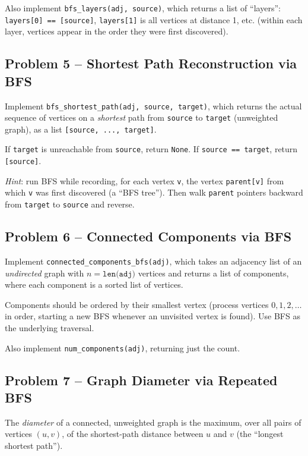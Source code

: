 \documentclass[11pt]{article}
\begin{document}
Also implement \texttt{bfs\_layers(adj, source)}, which returns a list of ``layers'':
\texttt{layers[0] == [source]}, \texttt{layers[1]} is all vertices at distance 1, etc.
(within each layer, vertices appear in the order they were first discovered).

\subsection*{Problem 5 -- Shortest Path Reconstruction via BFS}

Implement \texttt{bfs\_shortest\_path(adj, source, target)}, which returns the actual
sequence of vertices on a \emph{shortest} path from \texttt{source} to \texttt{target}
(unweighted graph), as a list \texttt{[source, ..., target]}.

If \texttt{target} is unreachable from \texttt{source}, return \texttt{None}. If
\texttt{source == target}, return \texttt{[source]}.

\emph{Hint}: run BFS while recording, for each vertex \texttt{v}, the vertex
\texttt{parent[v]} from which \texttt{v} was first discovered (a ``BFS tree''). Then walk
\texttt{parent} pointers backward from \texttt{target} to \texttt{source} and reverse.

\subsection*{Problem 6 -- Connected Components via BFS}

Implement \texttt{connected\_components\_bfs(adj)}, which takes an adjacency list of an
\emph{undirected} graph with $n = \texttt{len(adj)}$ vertices and returns a list of
components, where each component is a sorted list of vertices.

Components should be ordered by their smallest vertex (process vertices $0,1,2,\dots$ in
order, starting a new BFS whenever an unvisited vertex is found). Use BFS as the
underlying traversal.

Also implement \texttt{num\_components(adj)}, returning just the count.

\subsection*{Problem 7 -- Graph Diameter via Repeated BFS}

The \emph{diameter} of a connected, unweighted graph is the maximum, over all pairs of
vertices $(u,v)$, of the shortest-path distance between $u$ and $v$ (the ``longest
shortest path'').
\end{document}
